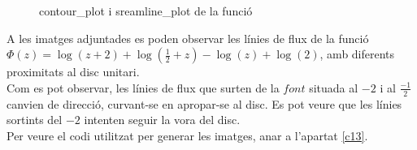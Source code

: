 \documentclass[a4paper, 11pt]{article}
\begin{document}
  \begin{figure}[h]
 \centering
 \caption{contour\_plot i sreamline\_plot de la funció}
 \label{13d}
\end{figure}
A les imatges adjuntades es poden observar les línies de flux de la funció $\Phi(z) = \log(z+2) + \log\left(\frac{1}{2}+z\right) - \log(z) + \log(2)$, amb diferents proximitats al disc unitari.\\
Com es pot observar, les línies de flux que surten de la $font$ situada al $-2$ i al $\frac{-1}{2}$ canvien de direcció, curvant-se en apropar-se al disc. Es pot veure que les línies sortints del $-2$ intenten seguir la vora del disc.\\
Per veure el codi utilitzat per generar les imatges, anar a l'apartat \textcolor{blue}{\ref{c13}}.\\
\clearpage
\end{document}
